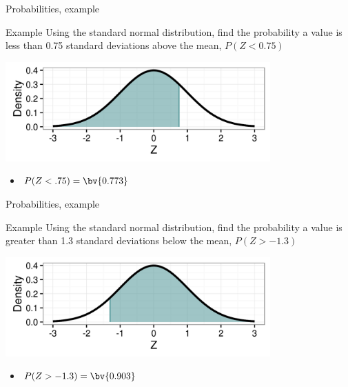 \documentclass[xcolor=table, handout]{beamer}
\begin{document}
\begin{frame}{Probabilities, example}
\begin{exampleblock}{Example}
Using the standard normal distribution, find the probability a value is less than 0.75 standard deviations above the mean, $P(Z < 0.75)$\\
\smallskip
{\centering
\includegraphics[width=4in]{../images/ch6_ex01}
\par}
\begin{itemize}
\pause\item $P(Z < .75) = \bv{0.773}$
\end{itemize}
\end{exampleblock}
\end{frame}

\begin{frame}{Probabilities, example}
\begin{exampleblock}{Example}
Using the standard normal distribution, find the probability a value is greater than 1.3 standard deviations below the mean, $P(Z > -1.3)$\\
\smallskip
{\centering
\includegraphics[width=4in]{../images/ch6_ex02}
\par}
\begin{itemize}
\pause\item $P(Z > -1.3) = \bv{0.903}$
\end{itemize}
\end{exampleblock}
\end{frame}
\end{document}

